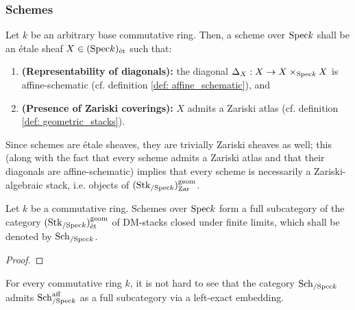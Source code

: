            \subsubsection{Schemes}
                \begin{definition} \label{def: schemes} 
                    Let $k$ be an arbitrary base commutative ring. Then, a scheme over $\mathrm{Spec} k$ shall be an \'etale sheaf $X \in (\mathrm{Spec} k)_{\mathrm{\acute{e}t}}$ such that:
                        \begin{enumerate}
                            \item \textbf{(Representability of diagonals):} the diagonal $\Delta_X: X \to X \x_{\Spec k} X$ is affine-schematic (cf. definition \ref{def: affine_schematic}), and
                            \item \textbf{(Presence of Zariski coverings):} $X$ admits a Zariski atlas (cf. definition \ref{def: geometric_stacks}).
                        \end{enumerate}
                \end{definition}
                \begin{remark} \label{remark: schemes_are_zariski_algebraic_stacks}
                    Since schemes are \'etale sheaves, they are trivially Zariski sheaves as well; this (along with the fact that every scheme admits a Zariski atlas and that their diagonals are affine-schematic) implies that every scheme is necessarily a Zariski-algebraic stack, i.e. objects of $(\mathrm{Stk}_{/\mathrm{Spec} k})_{\mathrm{Zar}}^{\mathrm{geom}}$. 
                \end{remark}
                
                \begin{theorem} \label{theorem: scheme_categories} 
                    Let $k$ be a commutative ring. Schemes over $\mathrm{Spec} k$ form a full subcategory of the category $(\mathrm{Stk}_{/\mathrm{Spec} k})^{\mathrm{geom}}_{\mathrm{\acute{e}t}}$ of DM-stacks closed under finite limits, which shall be denoted by $\mathrm{Sch}_{/\mathrm{Spec} k}$. 
                \end{theorem}
                    \begin{proof}
                        
                    \end{proof}
                \begin{remark} \label{remark: affine_schemes_are_schemes}
                    For every commutative ring $k$, it is not hard to see that the category $\mathrm{Sch}_{/\mathrm{Spec} k}$ admits $\mathrm{Sch}^{\mathrm{aff}}_{/\mathrm{Spec} k}$ as a full subcategory via a left-exact embedding. 
                \end{remark}
                    
